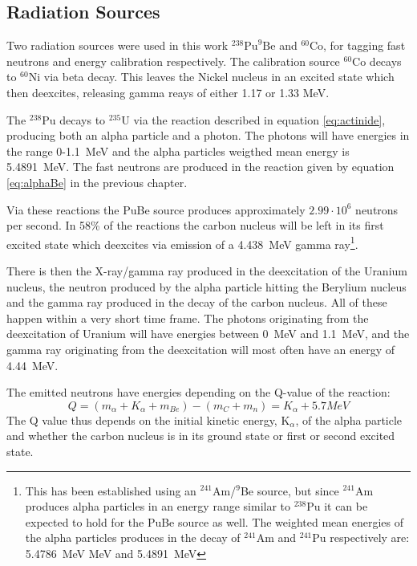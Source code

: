 \documentclass[main.tex]{subfiles}
\begin{document}
\subsection{Radiation Sources}
Two radiation sources were used in this work $^\text{238}\text{Pu}^\text{9}\text{Be}$ and $^\text{60}\text{Co}$, for tagging fast neutrons and energy calibration respectively. The calibration source $^\text{60}\text{Co}$ decays to $^\text{60}\text{Ni}$ via beta decay. This leaves the Nickel nucleus in an excited state which then deexcites, releasing gamma reays of either 1.17 or 1.33 MeV\cite{Nudat}.


The $^\textrm{238}$Pu decays to $^\textrm{235}$U via the reaction described in equation \ref{eq:actinide}, producing both an alpha particle and a photon. The photons will have energies in the range 0-\SI{1.1}{\MeV}\cite{Nudat} and the alpha particles weigthed mean energy is \SI{5.4891}{\mega\eV}\cite{Scherzinger:2017}. The fast neutrons are produced in the reaction given by equation \ref{eq:alphaBe} in the previous chapter.

Via these reactions the PuBe source produces approximately $\text{2.99}\cdot\text{10}^\text{6}$ neutrons per second\cite{Scherzinger:2017}. In 58\% of the reactions the carbon nucleus will be left in its first excited state which deexcites via emission of a \SI{4.438}{\mega\eV} gamma ray\cite{Scherzinger:2015}\footnote{This has been established using an $^\text{241}$Am/$^\text{9}$Be source, but since $^\text{241}$Am produces alpha particles in an energy range similar to $^\text{238}$Pu it can be expected to hold for the PuBe source as well. The weighted mean energies of the alpha particles produces in the decay of $^\text{241}$Am and $^\text{241}$Pu respectively are: \SI{5.4786}{\mega\eV} MeV and \SI{5.4891}{\mega\eV}\cite{Scherzinger:2017}}.

There is then the X-ray/gamma ray produced in the deexcitation of the Uranium nucleus, the neutron produced by the alpha particle hitting the Berylium nucleus and the gamma ray produced in the decay of the carbon nucleus. All of these happen within a very short time frame. The photons originating from the deexcitation of Uranium will have energies between \SI{0}{\MeV} and \SI{1.1}{\MeV}, and the gamma ray originating from the deexcitation will most often have an energy of \SI{4.44}{MeV}.

The emitted neutrons have energies depending on the Q-value of the reaction:
$$Q = (m_\alpha + K_\alpha + m_{Be}) - (m_{C} + m_n) = K_\alpha + 5.7 MeV$$
The Q value thus depends on the initial kinetic energy, K$_\alpha$, of the alpha particle and whether the carbon nucleus is in its ground state or first or second excited state. 
\end{document}
